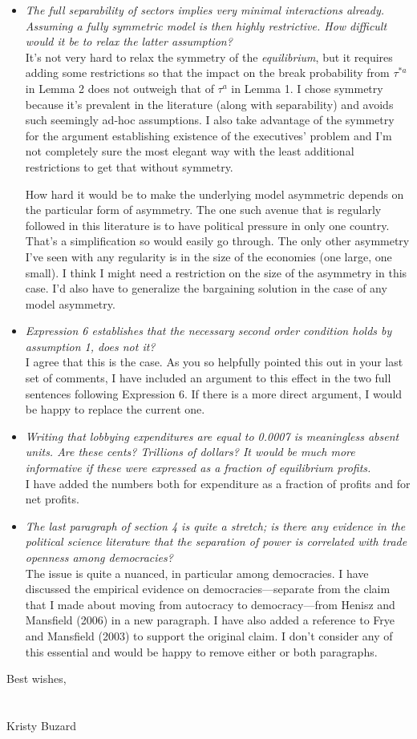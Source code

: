 \documentclass[12pt]{report}
\begin{document}
\begin{itemize}
  \item \textit{The full separability of sectors implies very minimal interactions already. Assuming a fully symmetric model is then highly restrictive. How difficult would it be to relax the latter assumption?} \\
	It's not very hard to relax the symmetry of the \textit{equilibrium}, but it requires adding some restrictions so that the impact on the break probability from $\tau^{*a}$ in Lemma 2 does not outweigh that of $\tau^a$ in Lemma 1. I chose symmetry because it's prevalent in the literature (along with separability) and avoids such seemingly ad-hoc assumptions. I also take advantage of the symmetry for the argument establishing existence of the executives' problem and I'm not completely sure the most elegant way with the least additional restrictions to get that without symmetry.
	
	How hard it would be to make the underlying model asymmetric depends on the particular form of asymmetry. The one such avenue that is regularly followed in this literature is to have political pressure in only one country. That's a simplification so would easily go through. The only other asymmetry I've seen with any regularity is in the size of the economies (one large, one small). I think I might need a restriction on the size of the asymmetry in this case. I'd also have to generalize the bargaining solution in the case of any model asymmetry.
	
  \item \textit{Expression 6 establishes that the necessary second order condition holds by assumption 1, does not it?} \\
	I agree that this is the case. As you so helpfully pointed this out in your last set of comments, I have included an argument to this effect in the two full sentences following Expression 6. If there is a more direct argument, I would be happy to replace the current one.
  \item \textit{Writing that lobbying expenditures are equal to 0.0007 is meaningless absent units. Are these cents? Trillions of dollars? It would be much more informative if these were expressed as a fraction of equilibrium profits.} \\
	I have added the numbers both for expenditure as a fraction of profits and for net profits.
	
  \item \textit{The last paragraph of section 4 is quite a stretch; is there any evidence in the political science literature that the separation of power is correlated with trade openness among democracies?} \\
	The issue is quite a nuanced, in particular among democracies. I have discussed the empirical evidence on democracies---separate from the claim that I made about moving from autocracy to democracy---from Henisz and Mansfield (2006) in a new paragraph. I have also added a reference to Frye and Mansfield (2003) to support the original claim. I don't consider any of this essential and would be happy to remove either or both paragraphs.
\end{itemize}


Best wishes,\\
\\
\\
Kristy Buzard
\end{document}
